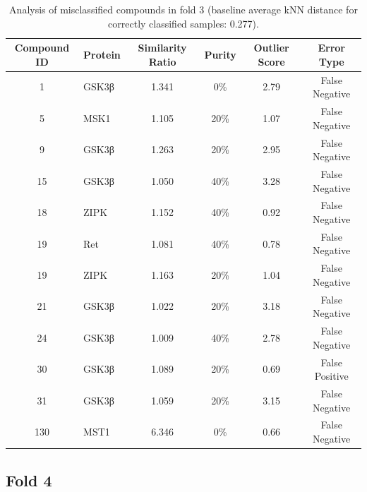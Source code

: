 \documentclass{article}
\newenvironment{smarttabular}[1]{%
    \begin{tabular}{#1}%
}{%
    \end{tabular}%
}
\begin{document}
\begin{table}[H]
    \centering
    \small
    \caption{Analysis of misclassified compounds in fold 3 (baseline average kNN distance for correctly classified samples: 0.277).}
    \label{tab:misclassified_compounds_3}
    \begin{smarttabular}{clcccc}
        \toprule
        \textbf{Compound ID} & \textbf{Protein} & \textbf{Similarity Ratio} & \textbf{Purity} & \textbf{Outlier Score} & \textbf{Error Type} \\
        \midrule
        1 & GSK3β & 1.341 & 0\% & 2.79 & False Negative \\
        5 & MSK1 & 1.105 & 20\% & 1.07 & False Negative \\
        9 & GSK3β & 1.263 & 20\% & 2.95 & False Negative \\
        15 & GSK3β & 1.050 & 40\% & 3.28 & False Negative \\
        18 & ZIPK & 1.152 & 40\% & 0.92 & False Negative \\
        19 & Ret & 1.081 & 40\% & 0.78 & False Negative \\
        19 & ZIPK & 1.163 & 20\% & 1.04 & False Negative \\
        21 & GSK3β & 1.022 & 20\% & 3.18 & False Negative \\
        24 & GSK3β & 1.009 & 40\% & 2.78 & False Negative \\
        30 & GSK3β & 1.089 & 20\% & 0.69 & False Positive \\
        31 & GSK3β & 1.059 & 20\% & 3.15 & False Negative \\
        130 & MST1 & 6.346 & 0\% & 0.66 & False Negative \\
        \bottomrule
    \end{smarttabular}
\end{table}

\clearpage

\subsection{Fold 4}
\end{document}

